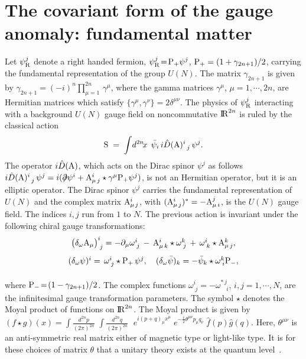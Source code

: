 \documentclass[a4paper,12pt]{article}
\def\A{{\rm A}}
\def\prslash{{\partial\mkern-9mu/}}
\def\prslash{{\partial\mkern-9mu/}}    %
\def\idpn{\int\! \frac{d^{2n}\!p}{(2\pi)^{2n}} \,\,}
\def\idqn{\int\! \frac{d^{2n}\!q}{(2\pi)^{2n}} \,\,}
\def\idxn{\int\! d^{2n}\!x \,}
\def\RR{{\rm I\!\!\, R}}
\begin{document}
\section{The covariant form of the gauge anomaly: fundamental matter}

Let $\psi^j_{\rm R}$ denote a right handed fermion, 
$\psi^j_{\rm R}\!=\!{\rm P}_{+}\psi^{j}$, ${\rm P}_{+}=(1+\gamma_{2n+1})/2$,  
carrying the fundamental representation of the group $U(N)$. 
The matrix $\gamma_{2n+1}$ is given by $\gamma_{2n+1}=(-i)^{n}\prod_{\mu=1}^{2n}\,\gamma^{\mu}$, where the gamma matrices $\gamma^{\mu}$, $\mu=1,\cdots,2n$, are Hermitian matrices 
which satisfy 
$\{\gamma^{\mu},\gamma^{\nu}\}=2\delta^{\mu\nu}$. 
The physics of $\psi^j_{\rm R}$ interacting 
with a background $U(N)$  gauge field on noncommutative $\RR^{2n}$ 
is ruled by the classical action 
\begin{equation}
{\rm S}\;=\;\idxn\;\bar{\psi}_i\, i\hat{D}(\A)^i_{\;\;j}\,\psi^j.
\label{chiralclassact}
\end{equation}
The operator $i\hat{D}(\A)$, which acts on the Dirac spinor $\psi^j$ as follows 
$i\hat{D}(\A)^{i}_{\;\;j}\,\psi^j =i(\prslash\psi^{i} +
\A^{i}_{\mu\,j}\star\gamma^{\mu} {\rm P}_{+}\psi^{j})$,
is not an Hermitian operator, but it is an elliptic operator.
The Dirac spinor $\psi^j$  carries the fundamental 
representation of $U(N)$ and the complex matrix $\A^{i}_{\mu\,j}$, with 
$(\A^{i}_{\mu\,j})^*=-\A^{j}_{\mu\,i}$, is the $U(N)$ gauge field. 
The indices $i,j$ run from $1$ to $N$. The previous action is invariant under
the following chiral gauge transformations:
\begin{equation}
\begin{array}{c}
{\big(\delta_{\omega} \A_{\mu}\big)^i_{\;j}= 
-\partial_{\mu}\omega^i_{\;j}\,-\,\A^i_{\mu\,k}\star\omega^k_{\;j}\,+
\,\omega^i_{\;k}\star\A^k_{\mu\,j},}\\[9pt] 
{(\delta_{\omega}\psi)^i=\,\omega^i_{\;j}\star {\rm P}_{+}\,\psi^j,\quad
(\delta_{\omega} \bar{\psi})_{k}=
-\bar{\psi}_k\star\omega^{k}_{\;i}{\rm P}_{-},}\\[9pt]
\end{array}
\label{chiraltrans}
\end{equation}
where ${\rm P}_{-}\!=\!(1-\gamma_{2n+1})/2$. The complex functions  
$\omega^i_{\;j}=-\omega^{*\,j}_{\quad i}$, $i,j=1,\cdots, N$, 
are the infinitesimal gauge  transformation parameters. The symbol $\star$ 
denotes  the Moyal product of functions on $\RR^{2n}$.
The Moyal product is given by
$(f\star g)(x)= 
\idpn\idqn\;e^{i(p+q)_{\mu}x^{\mu}} \;
e^{-\frac{i}{2}\theta^{\mu\nu}p_{\mu}q_{\nu}}\;\hat{f}(p)\hat{g}(q)$.
Here, $\theta^{\mu\nu}$ is an anti-symmetric real matrix  either of  
magnetic type or light-like type. It is for these choices of 
matrix $\theta$ that a unitary theory exists at the quantum 
level~\cite{Gomis:2000zz, Aharony:2000gz, Alvarez-Gaume:2001ka, Bassetto:2001vf}.
\end{document}
